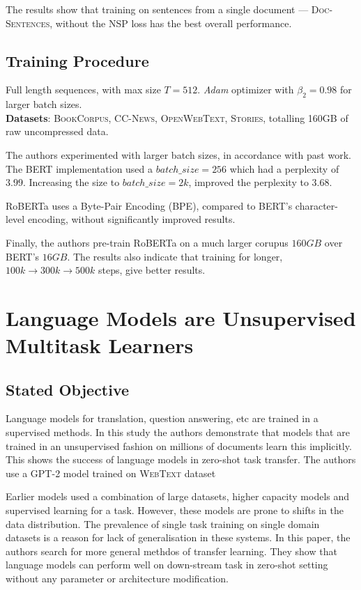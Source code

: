 \documentclass[12pt]{article}
\begin{document}
The results show that training on sentences from a single document --- \textsc{Doc-Sentences}, without the NSP loss has the best overall performance.

\subsection*{Training Procedure}
Full length sequences, with max size $T = 512$. \textit{Adam} optimizer with  $\beta_2 = 0.98$ for larger batch sizes. \\
\textbf{Datasets}: \textsc{BookCorpus, CC-News, OpenWebText, Stories}, totalling 160GB of raw uncompressed data.

The authors experimented with larger batch sizes, in accordance with past work. The BERT implementation used a $batch\_size = 256$ which had a perplexity of $3.99$. Increasing the size to $batch\_size = 2k$, improved the perplexity to $3.68$.

RoBERTa uses a Byte-Pair Encoding (BPE), compared to BERT's character-level encoding, without significantly improved results.

Finally, the authors pre-train RoBERTa on a much larger corupus $160 GB$ over BERT's $16GB$. The results also indicate that training for longer, $100k \rightarrow 300k \rightarrow 500k$ steps, give better results.

\clearpage

\section*{Language Models are Unsupervised Multitask Learners}

\subsection*{Stated Objective}

Language models for translation, question answering, etc are trained in a supervised methods. In this study the authors demonstrate that models that are trained in an unsupervised fashion on millions of documents learn this implicitly. This shows the success of language models in zero-shot task transfer. The authors use a GPT-2 model trained on \textsc{WebText} dataset

Earlier models used a combination of large datasets, higher capacity models and supervised learning for a task. However, these models are prone to shifts in the data distribution. The prevalence of single task training on single domain datasets is a reason for lack of generalisation in these systems. In this paper, the authors search for more general methdos of transfer learning. They show that language models can perform well on down-stream task in zero-shot setting without any parameter or architecture modification.
\end{document}

